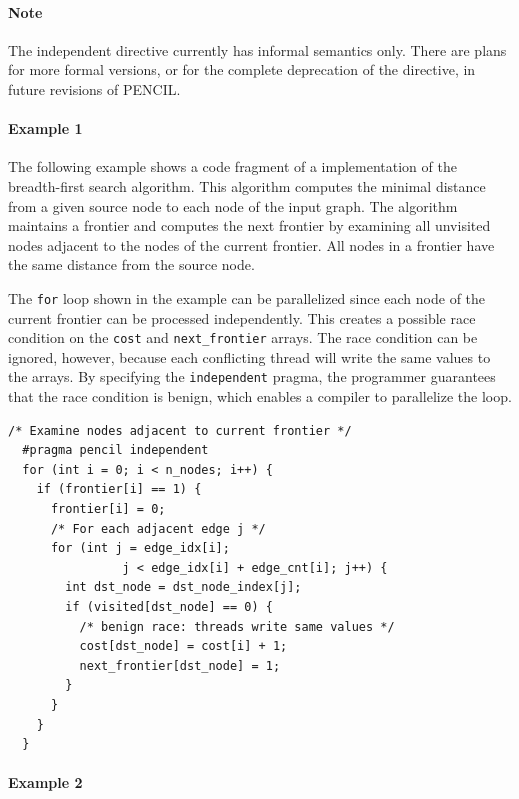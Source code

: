 \paragraph{Note}
The independent directive currently has informal semantics only. There
are plans for more formal versions, or for the complete deprecation of
the directive, in future revisions of PENCIL.

\paragraph{Example 1}
  The following example shows a code fragment of a \pencil
  implementation of the breadth-first search algorithm.
  This algorithm computes the minimal distance from a given source node to
  each node of the input graph.
  The algorithm maintains a frontier and computes the next frontier by examining
  all unvisited nodes adjacent to the nodes of the current frontier.
  All nodes in a frontier have the same distance from the source node.

  The \lstinline|for| loop shown in the example can be
  parallelized since each node of the current frontier can be processed
  independently.
  This creates a possible race condition on the \lstinline|cost| and
  \lstinline|next_frontier| arrays.
  The race condition can be ignored, however, because each conflicting thread
  will write the same values to the arrays.
  By specifying the \lstinline|independent| pragma, the programmer guarantees
  that the race condition is benign, which enables a \pencil compiler to
  parallelize the loop.

  \begin{lstlisting}[language=pencil]
  /* Examine nodes adjacent to current frontier */
  #pragma pencil independent
  for (int i = 0; i < n_nodes; i++) {
    if (frontier[i] == 1) {
      frontier[i] = 0;
      /* For each adjacent edge j */
      for (int j = edge_idx[i];
                j < edge_idx[i] + edge_cnt[i]; j++) {
        int dst_node = dst_node_index[j];
        if (visited[dst_node] == 0) {
          /* benign race: threads write same values */
          cost[dst_node] = cost[i] + 1;
          next_frontier[dst_node] = 1;
        }
      }
    }
  }
  \end{lstlisting}

\paragraph{Example 2}

